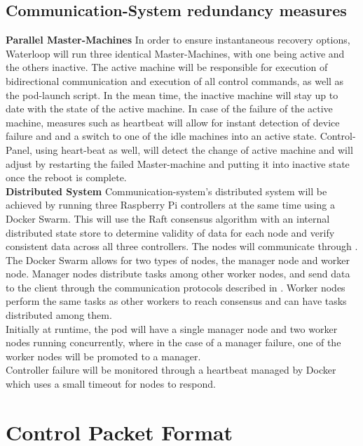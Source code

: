 \subsection{Communication-System redundancy measures}
\qquad\textbf{Parallel Master-Machines} In order to ensure instantaneous recovery options, Waterloop will run three identical Master-Machines, with one being active and the others inactive. The active machine will be responsible for execution of bidirectional communication and execution of all control commands, as well as the pod-launch script. In the mean time, the inactive machine will stay up to date with the state of the active machine. In case of the failure of the active machine, measures such as heartbeat will allow for instant detection of device failure and and a switch to one of the idle machines into an active state. Control-Panel, using heart-beat as well, will detect the change of active machine and will adjust by restarting the failed Master-machine and putting it into inactive state once the reboot is complete.\\

\textbf{Distributed System} Communication-system's distributed system will be achieved by running three Raspberry Pi controllers at the same time using a Docker Swarm. This will use the Raft consensus algorithm with an internal distributed state store to determine validity of data for each node and verify consistent data across all three controllers. The nodes will communicate through \itc.\\
    The Docker Swarm allows for two types of nodes, the manager node and worker node. Manager nodes distribute tasks among other worker nodes, and send data to the client through the communication protocols described in . Worker nodes perform the same tasks as other workers to reach consensus and can have tasks distributed among them.\\
    Initially at runtime, the pod will have a single manager node and two worker nodes running concurrently, where in the case of a manager failure, one of the worker nodes will be promoted to a manager.\\
    Controller failure will be monitored through a heartbeat managed by Docker which uses a small timeout for nodes to respond.
    
\section{Control Packet Format}
